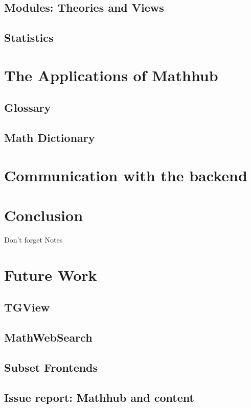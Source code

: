 \documentclass[11pt,a4paper]{article}
\begin{document}
	\subsection{Modules: Theories and Views}
	\subsection{Statistics}

\section{The Applications of Mathhub}
	\subsection{Glossary}
	\subsection{Math Dictionary}

\section{Communication with the backend}

\section{Conclusion}
Don't forget Notes

\section{Future Work}
	\subsection{TGView}
	\subsection{MathWebSearch}
	\subsection{Subset Frontends}
	\subsection{Issue report: Mathhub and content}
\end{document}
